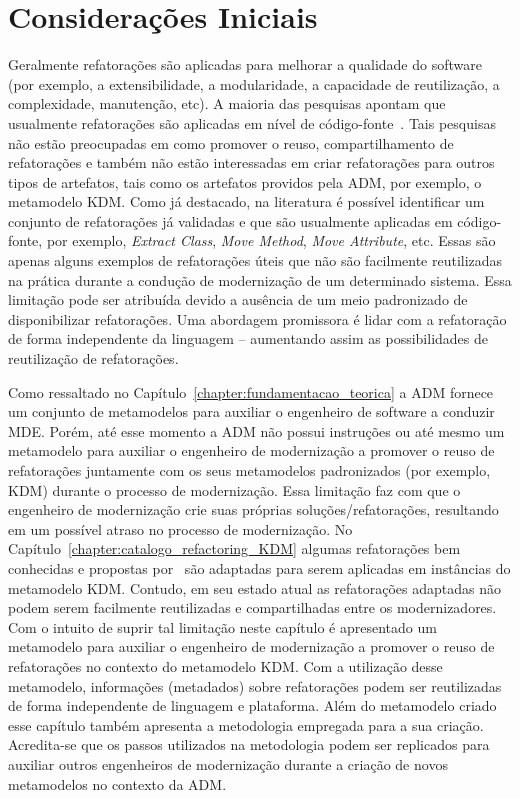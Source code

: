\section{Considerações Iniciais}\label{sec:consideracoes_iniciais}
Geralmente refatorações são aplicadas para melhorar a qualidade do software (por exemplo, a extensibilidade, a modularidade, a capacidade de reutilização, a complexidade, manutenção, etc). 
A maioria das pesquisas apontam que usualmente refatorações são aplicadas em nível de código-fonte~\cite{Fowler1999, Demeyer1, Demeyer2, OPDYKE_1992}. Tais pesquisas não estão preocupadas em como promover o reuso, compartilhamento de refatorações e também não estão interessadas em criar refatorações para outros tipos de artefatos, tais como os artefatos providos pela ADM, por exemplo, o metamodelo KDM. 
%
Como já destacado, na literatura é possível identificar um conjunto de refatorações já validadas e que são usualmente aplicadas em código-fonte, por exemplo, \textit{Extract Class}, \textit{Move Method}, \textit{Move Attribute}, etc. Essas são apenas alguns exemplos de refatorações úteis que não são facilmente reutilizadas na prática durante a condução de modernização de um determinado sistema. Essa limitação pode ser atribuída devido a ausência de um meio padronizado de disponibilizar refatorações. 
Uma abordagem promissora é lidar com a refatoração de forma independente da linguagem – aumentando assim as possibilidades de reutilização de refatorações.

Como ressaltado no Capítulo~\ref{chapter:fundamentacao_teorica} a ADM fornece um conjunto de metamodelos para auxiliar o engenheiro de software a conduzir MDE. 
Porém, até esse momento a ADM não possui instruções ou até mesmo um metamodelo para auxiliar o engenheiro de modernização a promover o reuso de refatorações juntamente com os seus metamodelos padronizados (por exemplo, KDM) durante o processo de modernização. 
Essa limitação faz com que o engenheiro de modernização crie suas próprias soluções/refatorações, resultando em um possível atraso no processo de modernização. 
No Capítulo~\ref{chapter:catalogo_refactoring_KDM} algumas refatorações bem conhecidas e propostas por~ são adaptadas para serem aplicadas em instâncias do metamodelo KDM. Contudo, em seu estado atual as refatorações adaptadas não podem serem facilmente reutilizadas e compartilhadas entre os modernizadores. 
Com o intuito de suprir tal limitação neste capítulo é apresentado um metamodelo para auxiliar o engenheiro de modernização a promover o reuso de refatorações no contexto do metamodelo KDM. Com a utilização desse metamodelo, informações (metadados) sobre refatorações podem ser reutilizadas de forma independente de linguagem e plataforma. Além do metamodelo criado esse capítulo também apresenta a metodologia empregada para a sua criação. Acredita-se que os passos utilizados na metodologia podem ser replicados para auxiliar outros engenheiros de modernização durante a criação de novos metamodelos no contexto da ADM.

